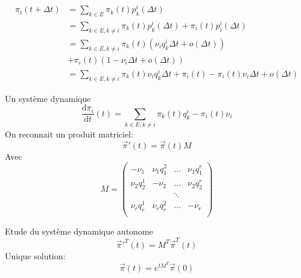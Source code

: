 \documentclass{beamer}
\theoremstyle{plain}
\theoremstyle{definition}
\theoremstyle{remark}
\begin{document}
\begin{frame}
    \begin{align*}
\pi_i(t+\Delta t)&=\sum_{k\in E}\pi_k(t)p_k^i(\Delta t)\\
&=\sum_{k\in E,k\neq i}\pi_k(t)p_k^i(\Delta t)+\pi_i(t)p_i^i(\Delta t)\\
&=\sum_{k\in E,k\neq i}\pi_k(t)(\nu_i q_k^i\Delta t+o(\Delta t))\\&+\pi_i(t)(1-\nu_i\Delta t+o(\Delta t))\\
&=\sum_{k\in E,k\neq i}\pi_k(t)\nu_iq_k^i\Delta t +\pi_i(t)-\pi_i(t)\nu_i\Delta t + o(\Delta t)
\end{align*}
\end{frame}
\begin{frame}{Un système dynamique}
   $$ \frac{\mathrm{d}\pi_i}{\mathrm{d}t}(t)=\sum_{k\in E,k\neq i}\pi_k(t)q_k^i-\pi_i(t)\nu_i$$
   On reconnait un produit matriciel:
   $$\vec{\pi}'(t)=\vec{\pi}(t)M$$
   Avec
   $$M=
\begin{pmatrix}
-\nu_1 & \nu_1q_1^2&\hdots&\nu_1q_1^r\\
\nu_2q_2^1& -\nu_2&\hdots&\nu_2q_2^r\\
&&\ddots\\
\nu_rq_r^1&\nu_rq_r^2&\hdots&-\nu_r\\
\end{pmatrix}
$$
\end{frame}
\begin{frame}{Etude du système dynamique autonome}
    $$\vec{\pi}'^T(t)=M^T\vec{\pi}^T(t)$$
    Unique solution:
  $$\vec{\pi}(t)=e^{tM^T}\vec{\pi}(0)$$
\end{frame}
\end{document}
